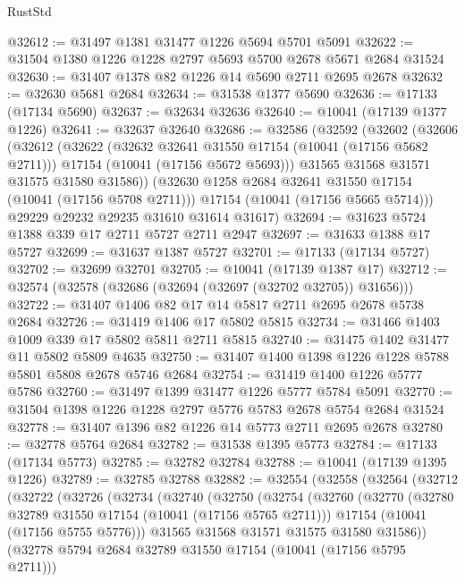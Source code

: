 \begin{lexlean}{RustStd}
\begin{coremodule}
@32612 := @31497 @1381 @31477 @1226 @5694 @5701 @5091
@32622 := @31504 @1380 @1226 @1228 @2797 @5693 @5700 @2678 @5671 @2684 @31524
@32630 := @31407 @1378 @82 @1226 @14 @5690 @2711 @2695 @2678
@32632 := @32630 @5681 @2684
@32634 := @31538 @1377 @5690
@32636 := @17133 (@17134 @5690)
@32637 := @32634 @32636
@32640 := @10041 (@17139 @1377 @1226)
@32641 := @32637 @32640
@32686 := @32586
    (@32592
      (@32602
        (@32606
          (@32612
            (@32622
              (@32632 @32641 @31550 @17154 (@10041 (@17156 @5682 @2711)))
              @17154
              (@10041 (@17156 @5672 @5693)))
            @31565
            @31568
            @31571
            @31575
            @31580
            @31586))
        (@32630 @1258 @2684 @32641 @31550 @17154 (@10041 (@17156 @5708 @2711)))
        @17154
        (@10041 (@17156 @5665 @5714)))
      @29229
      @29232
      @29235
      @31610
      @31614
      @31617)
@32694 := @31623 @5724 @1388 @339 @17 @2711 @5727 @2711 @2947
@32697 := @31633 @1388 @17 @5727
@32699 := @31637 @1387 @5727
@32701 := @17133 (@17134 @5727)
@32702 := @32699 @32701
@32705 := @10041 (@17139 @1387 @17)
@32712 := @32574 (@32578 (@32686 (@32694 (@32697 (@32702 @32705)) @31656)))
@32722 := @31407 @1406 @82 @17 @14 @5817 @2711 @2695 @2678 @5738 @2684
@32726 := @31419 @1406 @17 @5802 @5815
@32734 := @31466 @1403 @1009 @339 @17 @5802 @5811 @2711 @5815
@32740 := @31475 @1402 @31477 @11 @5802 @5809 @4635
@32750 := @31407 @1400 @1398 @1226 @1228 @5788 @5801 @5808 @2678 @5746 @2684
@32754 := @31419 @1400 @1226 @5777 @5786
@32760 := @31497 @1399 @31477 @1226 @5777 @5784 @5091
@32770 := @31504 @1398 @1226 @1228 @2797 @5776 @5783 @2678 @5754 @2684 @31524
@32778 := @31407 @1396 @82 @1226 @14 @5773 @2711 @2695 @2678
@32780 := @32778 @5764 @2684
@32782 := @31538 @1395 @5773
@32784 := @17133 (@17134 @5773)
@32785 := @32782 @32784
@32788 := @10041 (@17139 @1395 @1226)
@32789 := @32785 @32788
@32882 := @32554
    (@32558
      (@32564
        (@32712
          (@32722
            (@32726
              (@32734
                (@32740
                  (@32750
                    (@32754
                      (@32760
                        (@32770
                          (@32780 @32789 @31550 @17154 (@10041 (@17156 @5765 @2711)))
                          @17154
                          (@10041 (@17156 @5755 @5776)))
                        @31565
                        @31568
                        @31571
                        @31575
                        @31580
                        @31586))
                    (@32778 @5794 @2684 @32789 @31550 @17154 (@10041 (@17156 @5795 @2711)))

\end{coremodule}
\end{lexlean}
